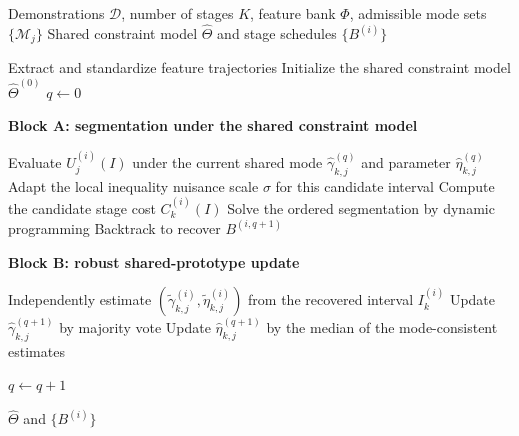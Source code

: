 \documentclass[lettersize,journal]{IEEEtran}
\begin{document}
\begin{algorithm}[t]
\caption{Stage-Wise Constraint Learning with Robust Shared Prototypes}
\label{alg:swcl}
\begin{algorithmic}[1]
\REQUIRE Demonstrations $\mathcal{D}$, number of stages $K$, feature bank $\Phi$, admissible mode sets $\{\mathcal{M}_j\}$
\ENSURE Shared constraint model $\widehat{\Theta}$ and stage schedules $\{B^{(i)}\}$

\STATE Extract and standardize feature trajectories
\STATE Initialize the shared constraint model $\widehat{\Theta}^{(0)}$
\STATE $q\leftarrow0$

\REPEAT

\STATE \textbf{Block A: segmentation under the shared constraint model}

            \STATE Evaluate $U_j^{(i)}(I)$ under the current shared mode $\widehat{\gamma}_{k,j}^{(q)}$ and parameter $\widehat{\eta}_{k,j}^{(q)}$
                \STATE Adapt the local inequality nuisance scale $\sigma$ for this candidate interval
            \ENDIF
        \ENDFOR
        \STATE Compute the candidate stage cost $C_k^{(i)}(I)$
    \ENDFOR
    \STATE Solve the ordered segmentation by dynamic programming
    \STATE Backtrack to recover $B^{(i,q+1)}$
\ENDFOR

\STATE \textbf{Block B: robust shared-prototype update}

            \STATE Independently estimate
            $\left(
            \widetilde{\gamma}_{k,j}^{(i)},
            \widetilde{\eta}_{k,j}^{(i)}
            \right)$
            from the recovered interval $I_k^{(i)}$
        \ENDFOR
        \STATE Update $\widehat{\gamma}_{k,j}^{(q+1)}$ by majority vote
            \STATE Update $\widehat{\eta}_{k,j}^{(q+1)}$ by the median of the mode-consistent estimates
        \ENDIF
    \ENDFOR
\ENDFOR

\STATE $q\leftarrow q+1$


\RETURN $\widehat{\Theta}$ and $\{B^{(i)}\}$
\end{algorithmic}
\end{algorithm}



% 
\end{document}
